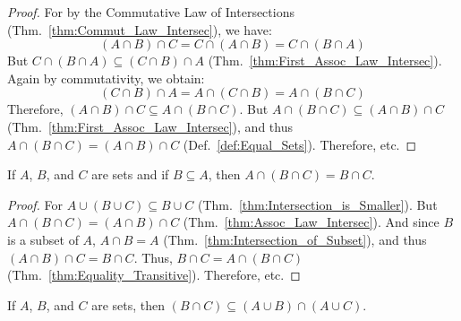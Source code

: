 \documentclass[crop=false,class=book,oneside]{standalone}
\begin{document}
            \begin{proof}
                For by the Commutative Law of Intersections
                (Thm.~\ref{thm:Commut_Law_Intersec}),
                we have:
                \begin{equation}
                    (A\cap{B})\cap{C}=C\cap(A\cap{B})
                                     =C\cap(B\cap{A})
                \end{equation}
                But $C\cap(B\cap{A})\subseteq(C\cap{B})\cap{A}$
                (Thm.~\ref{thm:First_Assoc_Law_Intersec}).
                Again by commutativity, we obtain:
                \begin{equation}
                    (C\cap{B})\cap{A}=A\cap(C\cap{B})
                                     =A\cap(B\cap{C})
                \end{equation}
                Therefore,
                $(A\cap{B})\cap{C}\subseteq{A}\cap(B\cap{C})$.
                But $A\cap(B\cap{C})\subseteq(A\cap{B})\cap{C}$
                (Thm.~\ref{thm:First_Assoc_Law_Intersec}),
                and thus $A\cap(B\cap{C})=(A\cap{B})\cap{C}$
                (Def.~\ref{def:Equal_Sets}). Therefore, etc.
            \end{proof}
            \begin{theorem}
                \label{thm:Redundant_Intersection}%
                If $A$, $B$, and $C$ are sets and if
                $B\subseteq{A}$, then
                $A\cap(B\cap{C})=B\cap{C}$.
            \end{theorem}
            \begin{proof}
                For $A\cup(B\cup{C})\subseteq{B}\cup{C}$
                (Thm.~\ref{thm:Intersection_is_Smaller}). But
                $A\cap(B\cap{C})=(A\cap{B})\cap{C}$
                (Thm.~\ref{thm:Assoc_Law_Intersec}).
                And since $B$ is a subset of $A$,
                $A\cap{B}=A$
                (Thm.~\ref{thm:Intersection_of_Subset}),
                and thus $(A\cap{B})\cap{C}=B\cap{C}$. Thus,
                $B\cap{C}=A\cap(B\cap{C})$
                (Thm.~\ref{thm:Equality_Transitive}).
                Therefore, etc.
            \end{proof}
            \begin{theorem}
                \label{thm:First_Pseudo_Dist_Law_Union}%
                If $A$, $B$, and $C$ are sets, then
                $(B\cap{C})\subseteq(A\cup{B})\cap(A\cup{C})$.
            \end{theorem}
\end{document}
